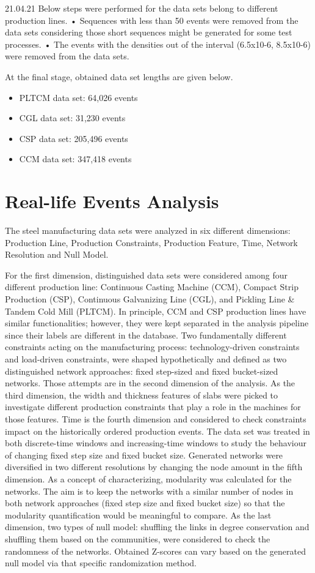 {21.04.21
Below steps were performed for the data sets belong to different production lines.
•	Sequences with less than 50 events were removed from the data sets considering those short sequences might be generated for some test processes. 
•	The events with the densities out of the interval (6.5x10-6, 8.5x10-6) were removed from the data sets.

At the final stage, obtained data set lengths are given below.
\begin{itemize}
	\item PLTCM data set: 64,026 events
	\item CGL data set: 31,230 events
	\item CSP data set: 205,496 events
	\item CCM data set: 347,418 events
\end{itemize}
}

\section{Real-life Events Analysis}
The steel manufacturing data sets were analyzed in six different dimensions: Production Line, Production Constraints, Production Feature, Time, Network Resolution and Null Model.

For the first dimension, distinguished data sets were considered among four different production line: Continuous Casting Machine (CCM), Compact Strip Production (CSP), Continuous Galvanizing Line (CGL), and Pickling Line \& Tandem Cold Mill (PLTCM). In principle, CCM and CSP production lines have similar functionalities; however, they were kept separated in the analysis pipeline since their labels are different in the database. Two fundamentally different constraints acting on the manufacturing process: technology-driven constraints and load-driven constraints, were shaped hypothetically and defined as two distinguished network approaches: fixed step-sized and fixed bucket-sized networks. Those attempts are in the second dimension of the analysis. As the third dimension, the width and thickness features of slabs were picked to investigate different production constraints that play a role in the machines for those features. Time is the fourth dimension and considered to check constraints impact on the historically ordered production events. The data set was treated in both discrete-time windows and increasing-time windows to study the behaviour of changing fixed step size and fixed bucket size. Generated networks were diversified in two different resolutions by changing the node amount in the fifth dimension. As a concept of characterizing, modularity was calculated for the networks. The aim is to keep the networks with a similar number of nodes in both network approaches (fixed step size and fixed bucket size) so that the modularity quantification would be meaningful to compare. As the last dimension, two types of null model: shuffling the links in degree conservation and shuffling them based on the communities, were considered to check the randomness of the networks. Obtained Z-scores can vary based on the generated null model via that specific randomization method.

